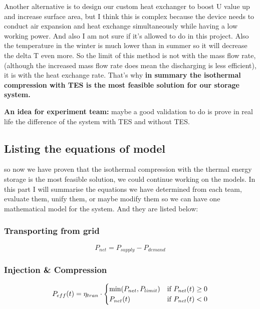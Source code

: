 Another alternative is to design our custom  heat exchanger to boost U value up and increase surface area, but I think this is complex because the device needs to conduct air expansion and heat exchange simultaneously while having a low working power. And also I am not sure if it's allowed to do in this project.  Also the temperature in the winter is much lower than in summer so it will decrease the delta T even more. So the limit of this method is not with the mass flow rate, (although the increased mass flow rate does mean the discharging is less efficient), it is with the heat exchange rate. That's why \textbf{in summary the isothermal compression with TES is the most feasible solution for our storage system.} 

\vspace{1em}

\textbf{An idea for experiment team:} maybe a good validation to do is prove in real life the difference of the system with TES and without TES. 

\subsection{Listing the equations of model}
 so now we have proven that the isothermal compression with the thermal energy storage is the most feasible solution, we could continue working on the models. In this part I will summarise the equations we have determined from each team, evaluate them, unify them, or maybe modify them so we can have one mathematical model for the system. And they are listed below:
 
 \subsubsection{Transporting from grid}
 \begin{equation}
P_{net} = P_{supply} - P_{demand}
\end{equation}
\vspace{1em}

\subsubsection{Injection \& Compression}
\begin{equation}
P_{eff}(t) =\eta_{tran} \cdot
\begin{cases}
\min(P_{net}, P_{limit}) & \text{if } P_{net}(t) \ge 0
\cr P_{net}(t) & \text{if } P_{net}(t) < 0
\end{cases}
\end{equation}
\vspace{1em}

